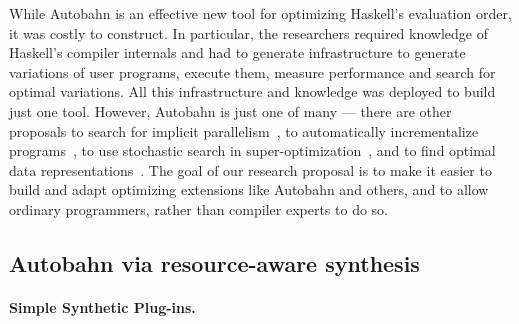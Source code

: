 While Autobahn is an effective new tool for optimizing Haskell's evaluation
order, it was costly to construct.  In particular, the researchers
required knowledge of Haskell's compiler internals and had to generate
infrastructure to generate variations of user programs, execute them,
measure performance and search for optimal variations.  All this
infrastructure and knowledge was deployed to build just one tool.  
However, Autobahn is just one of many --- there are other proposals to
search for implicit parallelism~\cite{?}, to automatically incrementalize
programs~\cite{type-directed-incrementalization}, to use stochastic search
in super-optimization~\cite{?,?,?}, and to find optimal data 
representations~\cite{?}.  The goal of our research proposal
is to make it easier to build and adapt optimizing extensions like
Autobahn and others, and to allow ordinary programmers, rather than 
compiler experts to do so.  

\subsection{Autobahn via resource-aware synthesis}

\paragraph{Simple Synthetic Plug-ins.} 
\label{sec:autobahn}

